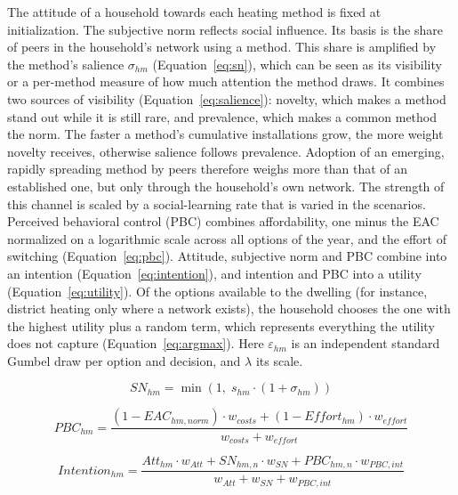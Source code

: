 \documentclass[preprint,12pt,authoryear]{elsarticle}
\begin{document}
The attitude of a household towards each heating method is fixed at
initialization. 
The subjective norm reflects social influence. Its basis is the share
of peers in the household's network using a method. This share is amplified
by the method's salience $\sigma_{hm}$ (Equation~\ref{eq:sn}), which can be 
seen as its visibility or a per-method measure of how much attention the 
method draws. It combines two
sources of visibility (Equation~\ref{eq:salience}): novelty, which makes a
method stand out while it is still rare, and prevalence, which makes a
common method the norm. The faster a method's cumulative installations
grow, the more weight novelty receives, otherwise salience follows
prevalence. Adoption of an emerging, rapidly spreading method by peers
therefore weighs more than that of an established one, but only through the
household's own network. The strength of this channel is scaled by a
social-learning rate that is varied in the scenarios.
Perceived behavioral
control (PBC) combines affordability, one minus the EAC normalized on a
logarithmic scale across all options of the year, and the effort of switching
(Equation~\ref{eq:pbc}). Attitude, subjective norm and PBC combine into an
intention (Equation~\ref{eq:intention}), and intention and PBC into a utility
(Equation~\ref{eq:utility}). Of the options available to the dwelling (for
instance, district heating only where a network exists), the household
chooses the one with the highest utility plus a random term, which represents
everything the utility does not capture (Equation~\ref{eq:argmax}). Here
$\varepsilon_{hm}$ is an independent standard Gumbel draw per option and
decision, and $\lambda$ its scale.

\begin{equation}\label{eq:sn}
  SN_{hm} = \min\!\left(1,\; s_{hm}\cdot\left(1 + \sigma_{hm}\right)\right)
\end{equation}

\begin{equation}\label{eq:pbc}
  PBC_{hm} = \frac{\left(1 - {EAC}_{hm,norm}\right)\cdot w_{costs}
    + \left(1 - Effort_{hm}\right)\cdot w_{effort}}
    {w_{costs} + w_{effort}}
\end{equation}

\begin{equation}\label{eq:intention}
  Intention_{hm} = \frac{Att_{hm}\cdot w_{Att}
    + SN_{hm,n}\cdot w_{SN}
    + PBC_{hm,n}\cdot w_{PBC, int}}
    {w_{Att} + w_{SN} + w_{PBC ,int}}
\end{equation}
\end{document}
